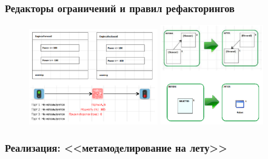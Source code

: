 \documentclass[14pt]{beamer}
\begin{document}
\begin{frame}
    \frametitle{Редакторы ограничений и правил рефакторингов}
    \begin{figure}
        \begin{center}
      		\includegraphics[width=0.5\textwidth]{images/presentation/constraints.png}
      		\hspace*{1cm}
      		\includegraphics[width=0.4\textwidth]{images/presentation/refactorings.png}
        \end{center}
    \end{figure}
\end{frame}

\begin{frame}
    \frametitle{\large Реализация: <<метамоделирование на лету>>}
    \begin{figure}
       	\begin{center}
       	\end{center}
    \end{figure}
\end{frame}
\end{document}

